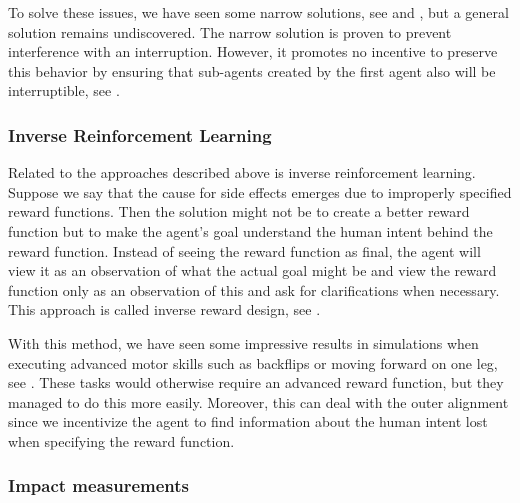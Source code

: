 \documentclass[12pt,A4]{report}
\theoremstyle{definition}
\begin{document}
To solve these issues, we have seen some narrow solutions, see \citet{Hadfield-Menell} and \citet{Carey}, but a general solution remains undiscovered. The narrow solution is proven to prevent interference with an interruption. However, it promotes no incentive to preserve this behavior by ensuring that sub-agents created by the first agent also will be interruptible, see \citet{co-founding}.  

\subsubsection{Inverse Reinforcement Learning}
Related to the approaches described above is inverse reinforcement learning. Suppose we say that the cause for side effects emerges due to improperly specified reward functions. Then the solution might not be to create a better reward function but to make the agent's goal understand the human intent behind the reward function. Instead of seeing the reward function as final, the agent will view it as an observation of what the actual goal might be and view the reward function only as an observation of this and ask for clarifications when necessary. This approach is called inverse reward design, see \citet{Hadfield-Menell2}.

With this method, we have seen some impressive results in simulations when executing advanced motor skills such as backflips or moving forward on one leg, see \citet{Christiano}. These tasks would otherwise require an advanced reward function, but they managed to do this more easily. Moreover, this can deal with the outer alignment since we incentivize the agent to find information about the human intent lost when specifying the reward function. 


\subsubsection{Impact measurements}
\end{document}
